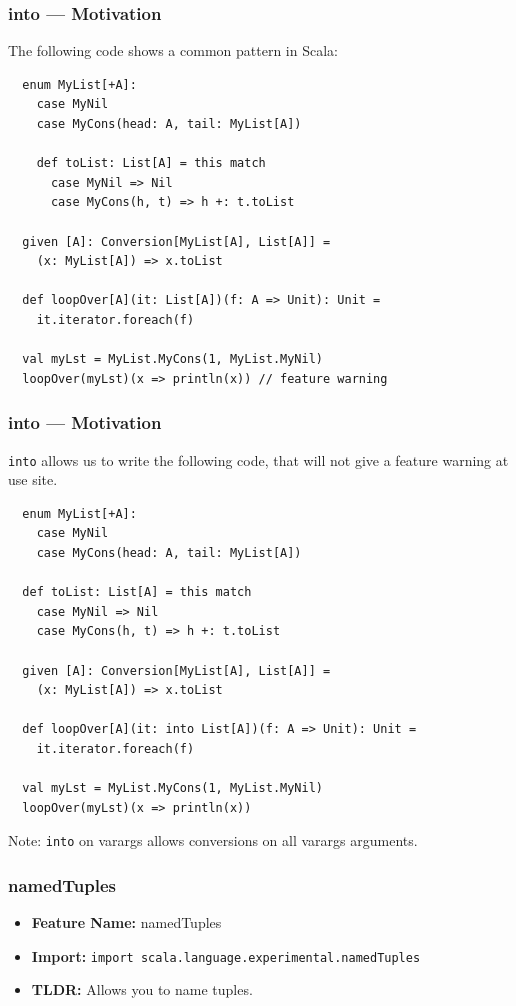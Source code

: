 \documentclass{beamer}
\begin{document}
\begin{frame}[fragile]
  \frametitle{into --- Motivation}

  The following code shows a common pattern in Scala:

  \begin{lstlisting}
  enum MyList[+A]:
    case MyNil
    case MyCons(head: A, tail: MyList[A])

    def toList: List[A] = this match
      case MyNil => Nil
      case MyCons(h, t) => h +: t.toList

  given [A]: Conversion[MyList[A], List[A]] =
    (x: MyList[A]) => x.toList

  def loopOver[A](it: List[A])(f: A => Unit): Unit =
    it.iterator.foreach(f)

  val myLst = MyList.MyCons(1, MyList.MyNil)
  loopOver(myLst)(x => println(x)) // feature warning
  \end{lstlisting}

\end{frame}

\begin{frame}[fragile]
  \frametitle{into --- Motivation}

  \texttt{into} allows us to write the following code, that will not give a feature warning at use site.

  \begin{lstlisting}
  enum MyList[+A]:
    case MyNil
    case MyCons(head: A, tail: MyList[A])

  def toList: List[A] = this match
    case MyNil => Nil
    case MyCons(h, t) => h +: t.toList

  given [A]: Conversion[MyList[A], List[A]] =
    (x: MyList[A]) => x.toList

  def loopOver[A](it: into List[A])(f: A => Unit): Unit =
    it.iterator.foreach(f)

  val myLst = MyList.MyCons(1, MyList.MyNil)
  loopOver(myLst)(x => println(x))
  \end{lstlisting}

  Note: \texttt{into} on varargs allows conversions on all varargs arguments.

\end{frame}

\begin{frame}[fragile]
  \frametitle{namedTuples}
  \begin{itemize}
    \item \textbf{Feature Name:} namedTuples
    \item \textbf{Import:} \texttt{import scala.language.experimental.namedTuples}
    \item \textbf{TLDR:} Allows you to name tuples.
  \end{itemize}
\end{frame}
\end{document}
